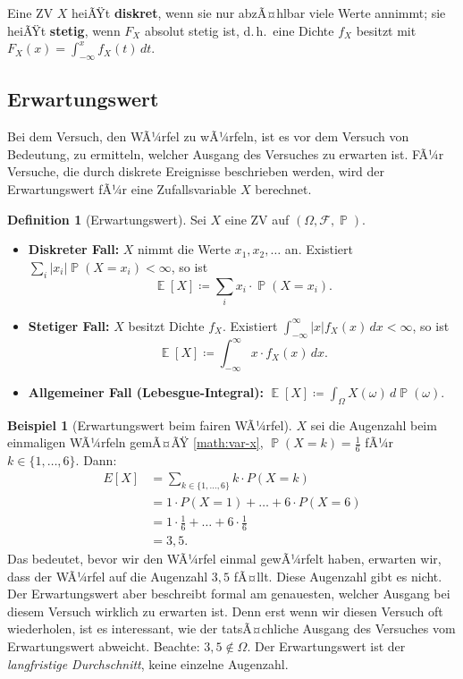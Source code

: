 ﻿\documentclass[12pt,a4paper]{article}
\theoremstyle{definition}
\newtheorem{definition}{Definition}[section]
\newtheorem{beispiel}{Beispiel}[section]
\theoremstyle{plain}
\theoremstyle{remark}
\DeclareMathOperator{\E}{\mathbb{E}}
\DeclareMathOperator{\Prob}{\mathbb{P}}
\begin{document}
Eine ZV $X$ heiÃŸt \textbf{diskret}, wenn sie nur abzÃ¤hlbar viele Werte annimmt;
sie heiÃŸt \textbf{stetig}, wenn $F_X$ absolut stetig ist, d.\,h.\ eine
Dichte $f_X$ besitzt mit $F_X(x) = \int_{-\infty}^{x} f_X(t)\,dt$.

\subsection{Erwartungswert}

Bei dem Versuch, den WÃ¼rfel zu wÃ¼rfeln, ist es vor dem Versuch von Bedeutung,
zu ermitteln, welcher Ausgang des Versuches zu erwarten ist. FÃ¼r Versuche,
die durch diskrete Ereignisse beschrieben werden, wird der Erwartungswert
fÃ¼r eine Zufallsvariable $X$ berechnet.

\begin{definition}[Erwartungswert]\label{def:ew}
  Sei $X$ eine ZV auf $(\Omega, \mathcal{F}, \Prob)$.
  \begin{itemize}
    \item \textbf{Diskreter Fall:} $X$ nimmt die Werte $x_1, x_2, \ldots$ an.
      Existiert $\sum_i |x_i| \Prob(X = x_i) < \infty$, so ist
      \[
        \E[X] \coloneqq \sum_{i} x_i \cdot \Prob(X = x_i).
      \]
    \item \textbf{Stetiger Fall:} $X$ besitzt Dichte $f_X$. Existiert
      $\int_{-\infty}^{\infty} |x| f_X(x)\,dx < \infty$, so ist
      \[
        \E[X] \coloneqq \int_{-\infty}^{\infty} x \cdot f_X(x)\,dx.
      \]
    \item \textbf{Allgemeiner Fall (Lebesgue-Integral):}
      $\E[X] \coloneqq \int_\Omega X(\omega)\,d\Prob(\omega)$.
  \end{itemize}
\end{definition}

\begin{beispiel}[Erwartungswert beim fairen WÃ¼rfel]\label{bsp:ewwuerfel}
  $X$ sei die Augenzahl beim einmaligen WÃ¼rfeln gemÃ¤ÃŸ \eqref{math:var-x},
  $\Prob(X=k)=\frac{1}{6}$ fÃ¼r $k \in \{1,\ldots,6\}$. Dann:
  \begin{align}
    E[X] &= \sum_{k \in \{1, \ldots, 6\}} k \cdot P(X = k) \\
         &= 1 \cdot P(X = 1) + \ldots + 6 \cdot P(X = 6) \\
         &= 1 \cdot \frac{1}{6} + \ldots + 6 \cdot \frac{1}{6} \\
         &= 3{,}5.
  \end{align}
  Das bedeutet, bevor wir den WÃ¼rfel einmal gewÃ¼rfelt haben, erwarten wir,
  dass der WÃ¼rfel auf die Augenzahl $3{,}5$ fÃ¤llt. Diese Augenzahl gibt es
  nicht. Der Erwartungswert aber beschreibt formal am genauesten, welcher
  Ausgang bei diesem Versuch wirklich zu erwarten ist. Denn erst wenn wir
  diesen Versuch oft wiederholen, ist es interessant, wie der tatsÃ¤chliche
  Ausgang des Versuches vom Erwartungswert abweicht. Beachte:
  $3{,}5 \notin \Omega$. Der Erwartungswert ist der \emph{langfristige
  Durchschnitt}, keine einzelne Augenzahl.
\end{beispiel}
\end{document}
